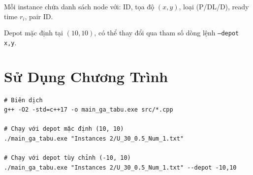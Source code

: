 \documentclass[12pt,a4paper]{article}
\begin{document}
Mỗi instance chứa danh sách node với: ID, tọa độ $(x, y)$, loại (P/DL/D), ready time $r_i$, pair ID.

Depot mặc định tại $(10, 10)$, có thể thay đổi qua tham số dòng lệnh \texttt{--depot x,y}.

\section{Sử Dụng Chương Trình}

\begin{verbatim}
# Biên dịch
g++ -O2 -std=c++17 -o main_ga_tabu.exe src/*.cpp

# Chạy với depot mặc định (10, 10)
./main_ga_tabu.exe "Instances 2/U_30_0.5_Num_1.txt"

# Chạy với depot tùy chỉnh (-10, 10)
./main_ga_tabu.exe "Instances 2/U_30_0.5_Num_1.txt" --depot -10,10
\end{verbatim}
\end{document}
